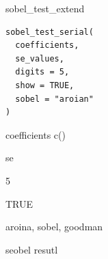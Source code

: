 \documentclass[a4paper]{book}
\begin{document}
%
\begin{Description}
sobel\_test\_extend
\end{Description}
%
\begin{Usage}
\begin{verbatim}
sobel_test_serial(
  coefficients,
  se_values,
  digits = 5,
  show = TRUE,
  sobel = "aroian"
)
\end{verbatim}
\end{Usage}
%
\begin{Arguments}
\begin{ldescription}
\item[\code{coefficients}] coefficients c()

\item[\code{se\_values}] se

\item[\code{digits}] 5

\item[\code{show}] TRUE

\item[\code{sobel}] aroina, sobel, goodman
\end{ldescription}
\end{Arguments}
%
\begin{Value}
seobel resutl
\end{Value}
%
\end{document}
